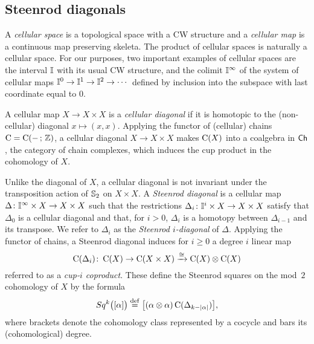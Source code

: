 
\subsection{Steenrod diagonals}

A \textit{cellular space} is a topological space with a CW structure and a \textit{cellular map} is a continuous map preserving skeleta.
The product of cellular spaces is naturally a cellular space.
For our purposes, two important examples of cellular spaces are the interval $\gcube$ with its usual CW structure, and the colimit $\gcube^\infty$ of the system of cellular maps $\gcube^0 \to \gcube^1 \to \gcube^2 \to \dotsb$ defined by inclusion into the subspace with last coordinate equal to $0$.

A cellular map $X \to X \times X$ is a \textit{cellular diagonal} if it is homotopic to the (non-cellular) diagonal $x \mapsto (x, x)$.
Applying the functor of (cellular) chains $\gchains = \gchains(-\, ;\, \Z)$, a cellular diagonal $X \to X \times X$ makes $\gchains(X)$ into a coalgebra in $\Ch$, the category of chain complexes, which induces the cup product in the cohomology of $X$.

Unlike the diagonal of $X$, a cellular diagonal is not invariant under the transposition action of $\S_2$ on $X \times X$.
A \textit{Steenrod diagonal} is a cellular map $\Delta \colon \gcube^\infty \times X \to X \times X$ such that the restrictions $\Delta_i \colon \gcube^i \times X \to X \times X$ satisfy that $\Delta_0$ is a cellular diagonal and that, for $i > 0$, $\Delta_i$ is a homotopy between $\Delta_{i-1}$ and its transpose.
We refer to $\Delta_i$ as the \textit{Steenrod $i$-diagonal} of $\Delta$.
Applying the functor of chains, a Steenrod diagonal induces for $i \geq 0$ a degree $i$ linear map
\[
\gchains(\Delta_i) \colon \gchains(X) \to \gchains(X \times X) \xra{\cong} \gchains(X) \otimes \gchains(X)
\]
referred to as a \textit{cup-$i$ coproduct}.
These define the Steenrod squares on the mod~$2$ cohomology of $X$ by the formula
\[
Sq^k\big( [\alpha] \big) \defeq \big[ (\alpha \otimes \alpha)\gchains(\Delta_{k-\bars{\alpha}}) \big],
\]
where brackets denote the cohomology class represented by a cocycle and bars its (cohomological) degree.


